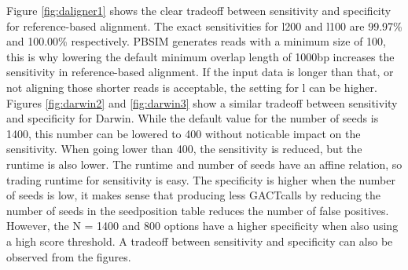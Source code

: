 \documentclass[../main/thesis.tex]{subfiles}
\begin{document}










Figure \ref{fig:daligner1} shows the clear tradeoff between sensitivity and specificity for reference-based alignment.
The exact sensitivities for l200 and l100 are 99.97\% and 100.00\% respectively.
PBSIM generates reads with a minimum size of 100, this is why lowering the default minimum overlap length of 1000bp increases the sensitivity in reference-based alignment.
If the input data is longer than that, or not aligning those shorter reads is acceptable, the setting for l can be higher.
Figures \ref{fig:darwin2} and \ref{fig:darwin3} show a similar tradeoff between sensitivity and specificity for Darwin.
While the default value for the number of seeds is 1400, this number can be lowered to 400 without noticable impact on the sensitivity.
When going lower than 400, the sensitivity is reduced, but the runtime is also lower.
The runtime and number of seeds have an affine relation, so trading runtime for sensitivity is easy.
The specificity is higher when the number of seeds is low, it makes sense that producing less GACTcalls by reducing the number of seeds in the seedposition table reduces the number of false positives.
However, the N = 1400 and 800 options have a higher specificity when also using a high score threshold.
A tradeoff between sensitivity and specificity can also be observed from the figures.
\end{document}

